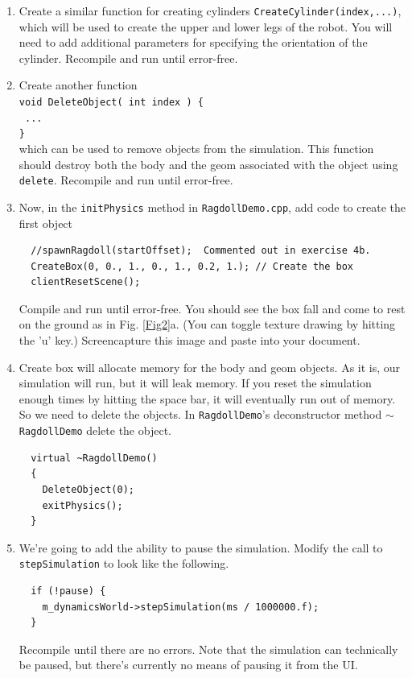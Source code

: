 \documentclass[12pt]{article}
\begin{document}
\begin{enumerate}
\item Create a similar function for creating cylinders \verb|CreateCylinder(index,...)|, which will be used to create the upper and lower legs of the robot. You will need to add additional parameters for specifying the orientation of the cylinder. Recompile and run until error-free.

\item Create another function \\
\texttt{void DeleteObject( int index ) \{}\\
\texttt{  ...}\\
\texttt{\}} \\
which can be used to remove objects from the simulation. This function should destroy both the body and the geom associated with the object using \texttt{delete}. Recompile and run until error-free.

\item Now, in the \verb|initPhysics| method in \verb|RagdollDemo.cpp|, add code to create the first object

\begin{verbatim}
  //spawnRagdoll(startOffset);  Commented out in exercise 4b.
  CreateBox(0, 0., 1., 0., 1., 0.2, 1.); // Create the box
  clientResetScene();   
\end{verbatim}
Compile and run until error-free.  You should see the box fall and come to rest on the ground as in Fig. \ref{Fig2}a. (You can toggle texture drawing by hitting the 'u' key.) Screencapture this image and paste into your document.

\item Create box will allocate memory for the body and geom objects.  As it is, our simulation will run, but it will leak memory.  If you reset the simulation enough times by hitting the space bar, it will eventually run out of memory.  So we need to delete the objects.  In \verb|RagdollDemo|'s deconstructor method \small{$\sim$}\verb|RagdollDemo| delete the object. 
\begin{verbatim}
  virtual ~RagdollDemo()
  {
    DeleteObject(0);
    exitPhysics();
  }
\end{verbatim}

\item We're going to add the ability to pause the simulation.  Modify the call to \verb|stepSimulation| to look like the following.

\begin{verbatim}
  if (!pause) {
    m_dynamicsWorld->stepSimulation(ms / 1000000.f);
  }
\end{verbatim}
Recompile until there are no errors.  Note that the simulation can technically be paused, but there's currently no means of pausing it from the UI.  


\end{enumerate}
\end{document}
